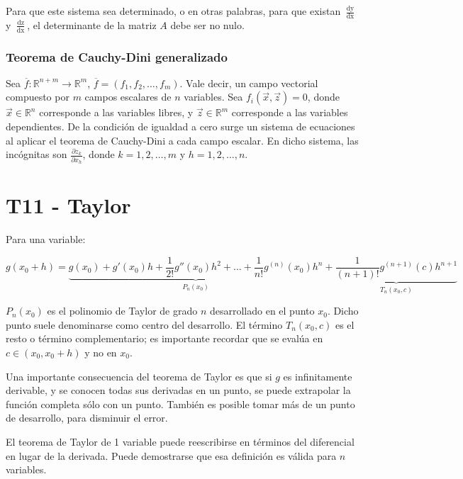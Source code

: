 \documentclass{article}
\renewcommand{\Bbb}{\mathbb}
\begin{document}
Para que este sistema sea determinado, o en otras palabras, para que existan $\frac{\mathop{dy}}{\mathop{dx}}$ y $\frac{\mathop{dz}}{\mathop{dx}}$, el determinante de la matriz $A$ debe ser no nulo.

\subsubsection{Teorema de Cauchy-Dini generalizado}

Sea $\overline{f}:\Bbb R^{n+m} \rightarrow \Bbb R^m$, $\overline{f} = (f_1, f_2, \ldots, f_m)$. Vale decir, un campo vectorial compuesto por $m$ campos escalares de $n$ variables. Sea $f_i(\overrightarrow{x}, \overrightarrow{z}) = 0$, donde $\overrightarrow{x} \in \Bbb R^n$ corresponde a las variables libres, y $\overrightarrow{z} \in \Bbb R^m$ corresponde a las variables dependientes. De la condición de igualdad a cero surge un sistema de ecuaciones al aplicar el teorema de Cauchy-Dini a cada campo escalar. En dicho sistema, las incógnitas son $\frac{\partial z_k}{\partial x_h}$, donde $k = 1, 2, \ldots, m$ y $h = 1, 2, \ldots, n$.

\section{T11 - Taylor}

Para una variable:

\begin{equation}
g(x_0 + h) = \underbrace{ g(x_0) + g'(x_0) h + \frac{1}{2!} g''(x_0) h^2 + \ldots + \frac{1}{n!} g^{(n)}(x_0) h^n }_{P_n(x_0)} +  \underbrace{ \frac{1}{(n+1)!} g^{(n+1)}(c) h^{n+1} }_{T_n(x_0, c)}
\end{equation}

$P_n(x_0)$ es el polinomio de Taylor de grado $n$ desarrollado en el punto $x_0$. Dicho punto suele denominarse como centro del desarrollo. El término $T_n(x_0, c)$ es el resto o término complementario; es importante recordar que se evalúa en $c \in (x_0, x_0 + h)$ y no en $x_0$.

Una importante consecuencia del teorema de Taylor es que si $g$ es infinitamente derivable, y se conocen todas sus derivadas en un punto, se puede extrapolar la función completa sólo con un punto. También es posible tomar más de un punto de desarrollo, para disminuir el error.

El teorema de Taylor de 1 variable puede reescribirse en términos del diferencial en lugar de la derivada. Puede demostrarse que esa definición es válida para $n$ variables.
\end{document}
